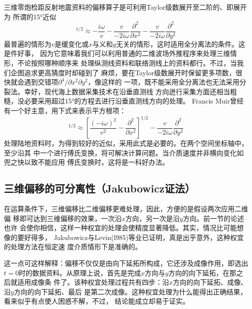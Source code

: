 三维零炮检距反射地震资料的偏移算子是可利用Taylor级数展开至二阶的、即展开为
所谓的15°近似
\begin{equation}
[\frac{(-i\omega)^2}{v^2}-\frac{\partial^2}{\partial x^2}-\frac{\partial^2}{\partial y^2}]^{1/2}
\approx -\frac{i\omega}{v}-\frac{v}{-2i\omega}\frac{\partial^2}{\partial x^2}-\frac{v}{-2i\omega}\frac{\partial^2}{\partial y^2}
\label{eq:ex2.4.4}
\end{equation}
最普遍的情形为$v$是缓变化或$x$与义和$y$无关的情形，这时适用全分离法的条件。这是件好事，
因为它意味着我们可以利用普通的二维波场外推程序来处理三维情形，不论按照哪种顺序来
处理纵测线资料和联络测线上的资料都行。不过，当我们企图追求更高猜度时却碰到了
麻烦，要在Taylor级数展开时保留更多项数，很快就会遇到交错项$\partial^4 /\partial x^2\partial y^2$，像这样的
一项，既不能采用全分离法也无法采用分裂法。幸好，现代海上数据采集技术在沿垂直测线
方向迸行采集方面还相当粗糙，没必要采用超过15°的方程去进行沿垂直测线方向的处理。
Francis Muir曾经有一个好主意，用下式来表示平方根项：
\begin{equation}
[\frac{(-i\omega)^2}{v^2}-\frac{\partial^2}{\partial x^2}-\frac{\partial^2}{\partial y^2}]^{1/2}
\approx [\frac{(-i\omega)^2}{v^2}-\frac{\partial^2}{\partial x^2}]^{1/2}-\frac{v}{-2i\omega}\frac{\partial^2}{\partial y^2}
\label{eq:ex2.4.5}
\end{equation}
处理陆地资料时，为得到较好的近似，采用此式是必要的。在两个空间坐标轴中，至少沿其
中一个进行傅氏变换，将可解决计算问题。当介质速度并非横向变化如兜之快以致不能应用
傅氏变换时，这将是一科好办法。

\subsection{三维偏移的可分离性（Jakubowicz证法）}
\label{sec:2.4.6}

在运算条件下，三维偏移比二维偏移更难处理，因此，方便的是假设两次应用二维偏
移即可达到三维偏移的效果，一次沿$x$方向，另一次是沿$y$方向。前一节的论述也许
会使你相信，这样一种权宜的处理会使精度显著降低。其实，情况比可能想像的要好得多，
Jakubowicz与Levin(l985)等业已证明，真是出乎意外，这种权宜的处理方法在恒定速
度介质情形下是准确的。

这一点可这样解释：偏移不仅仅是由向下延拓所构成，它还涉及成像作用，即选出$t
=0$时的数据资料。从原理上说，首先是完成$x$方向与$y$方向的向下延拓，在那之后就适用成像条
件了。该种权宜处理过程共有四步：沿$x$方向的向下延拓、成像、沿$y$方向的向下延拓、最后
是第二次成像。这种权宜处理为什么能得出正确结果，看来似乎有点使人困惑不解，不过，
结论能成立却易于证实。

